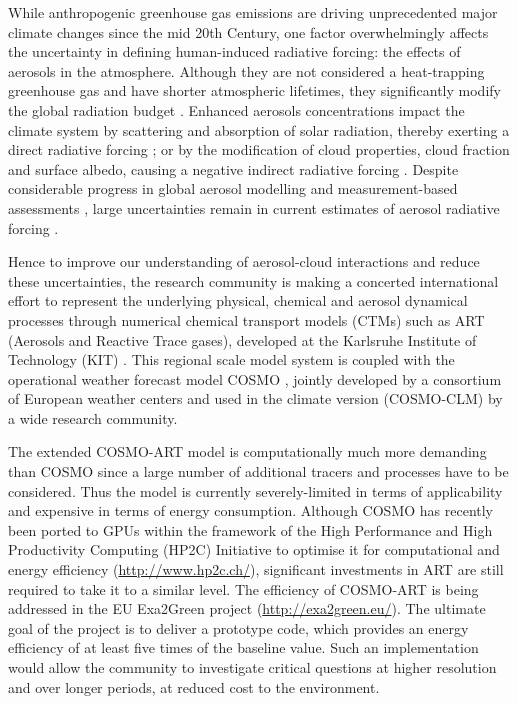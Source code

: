 While anthropogenic greenhouse gas emissions are driving unprecedented
major  climate  changes  since   the  mid  20th  Century,  one  factor
overwhelmingly  affects  the  uncertainty  in  defining  human-induced
radiative  forcing:  the  effects   of  aerosols  in  the  atmosphere.
Although they  are not considered  a heat-trapping greenhouse  gas and
have  shorter  atmospheric lifetimes,  they  significantly modify  the
global   radiation   budget   \citep{IPCC-2013}.   Enhanced   aerosols
concentrations impact the climate  system by scattering and absorption
of   solar   radiation,    thereby   exerting   a   direct   radiative
forcing  \citep{Liao-2005,  Bangert-2012,  Lundgren-2013}; or  by  the
modification of  cloud properties, cloud fraction  and surface albedo,
causing  a negative  indirect  radiative forcing  \citep{Haywood-2000,
Lohmann-2005,     VandenHeever-2011,     Rosenfeld-2013}.      Despite
considerable  progress in  global aerosol  modelling \citep{Mann-2013}
and    measurement-based    assessments   \citep{Myhre-2009},    large
uncertainties  remain  in   current  estimates  of  aerosol  radiative
forcing   \citep{Myhre-2013,    IPCC-2013,   Lee-2013,   Randles-2013,
Rosenfeld-2013, Sherwood-2013, Stier-2013}.

Hence to  improve our understanding of  aerosol-cloud interactions and
reduce  these  uncertainties,  the  research  community  is  making  a
concerted international  effort to represent  the underlying physical,
chemical  and aerosol dynamical  processes through  numerical chemical
transport  models (CTMs)  such  as ART  (Aerosols  and Reactive  Trace
gases),   developed   at  the   Karlsruhe   Institute  of   Technology
(KIT)  \citep{Vogel-2009,  Bangert-2011,  Knote-2013}.  This  regional
scale model  system is coupled  with the operational  weather forecast
model COSMO \citep{Baldauf-2011}, jointly developed by a consortium of
European weather  centers and used in the  climate version (COSMO-CLM)
by a wide research community.

The extended  COSMO-ART model  is computationally much  more demanding
than COSMO  since a large  number of additional tracers  and processes
have to  be considered.  Thus the model  is currently severely-limited
in  terms   of  applicability  and   expensive  in  terms   of  energy
consumption.    Although   COSMO   has   recently   been   ported   to
GPUs  \citep{Gysi-2014, Lapillonne-2014} within  the framework  of the
High Performance and High  Productivity Computing (HP2C) Initiative to
optimise    it    for     computational    and    energy    efficiency
(\url{http://www.hp2c.ch/}), significant investments  in ART are still
required to take  it to a similar level.   The efficiency of COSMO-ART
is     being    addressed    in     the    EU     Exa2Green    project
(\url{http://exa2green.eu/}). The  ultimate goal of the  project is to
deliver a  prototype code, which  provides an energy efficiency  of at
least five times of the  baseline value.  Such an implementation would
allow  the  community  to  investigate critical  questions  at  higher
resolution  and   over  longer  periods,   at  reduced  cost   to  the
environment.

